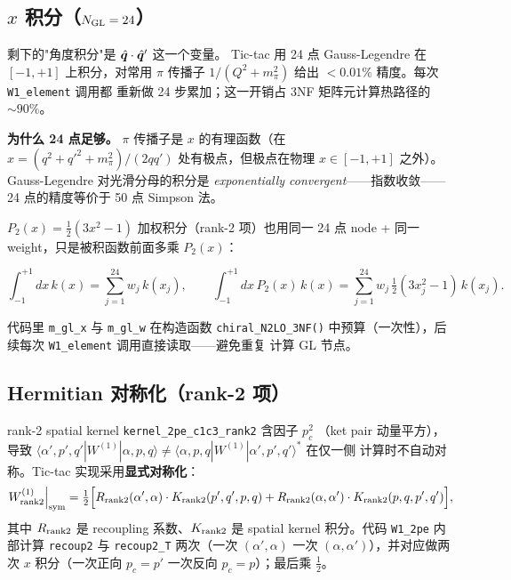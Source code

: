 \subsection{\(x\) 积分（\(N_{\rm GL} = 24\)）}
\label{subsec:ch15-x-integration}

剩下的"角度积分"是 \(\hat{\bm{q}} \cdot \hat{\bm{q}}'\) 这一个变量。
Tic-tac 用 24 点 Gauss-Legendre 在 \([-1, +1]\) 上积分，对常用 \(\pi\) 传播子
\(1/(Q^2 + m_\pi^2)\) 给出 \(<0.01\%\) 精度。每次 \texttt{W1\_element} 调用都
重新做 24 步累加；这一开销占 3NF 矩阵元计算热路径的 \(\sim 90\%\)。

\textbf{为什么 24 点足够。} \(\pi\) 传播子是 \(x\) 的有理函数（在
\(x = (q^2 + q'^2 + m_\pi^2)/(2qq')\) 处有极点，但极点在物理 \(x \in
[-1, +1]\) 之外）。Gauss-Legendre 对光滑分母的积分是
\emph{exponentially convergent}——指数收敛——24 点的精度等价于 50 点
Simpson 法。

\(P_2(x) = \tfrac{1}{2}(3x^2 - 1)\) 加权积分（rank-2 项）也用同一 24 点
node + 同一 weight，只是被积函数前面多乘 \(P_2(x)\)：

\begin{equation}
\label{eq:ch15-x-integration}
\int_{-1}^{+1} dx\, k(x)
= \sum_{j=1}^{24} w_j\, k(x_j),
\qquad
\int_{-1}^{+1} dx\, P_2(x)\, k(x)
= \sum_{j=1}^{24} w_j\, \tfrac{1}{2}(3 x_j^2 - 1)\, k(x_j).
\end{equation}

代码里 \texttt{m\_gl\_x} 与 \texttt{m\_gl\_w} 在构造函数 \texttt{chiral\_N2LO\_3NF()}
中预算（一次性），后续每次 \texttt{W1\_element} 调用直接读取——避免重复
计算 GL 节点。

\subsection{Hermitian 对称化（rank-2 项）}
\label{subsec:ch15-hermitian-sym}

rank-2 spatial kernel \texttt{kernel\_2pe\_c1c3\_rank2} 含因子 \(p_c^2\)
（ket pair 动量平方），导致
\(\langle \alpha', p', q' | W^{(1)} | \alpha, p, q \rangle \neq
 \langle \alpha, p, q | W^{(1)} | \alpha', p', q' \rangle^*\) 在仅一侧
计算时不自动对称。Tic-tac 实现采用\textbf{显式对称化}：
\begin{equation}
\label{eq:ch15-hermitian}
W^{(1)}_{\rm rank2}\Big|_{\rm sym}
= \tfrac{1}{2} \Big[ R_{\rm rank2}(\alpha', \alpha) \cdot K_{\rm rank2}(p',q',p,q)
                   + R_{\rm rank2}(\alpha, \alpha') \cdot K_{\rm rank2}(p,q,p',q') \Big],
\end{equation}
其中 \(R_{\rm rank2}\) 是 recoupling 系数、\(K_{\rm rank2}\) 是 spatial kernel
积分。代码 \texttt{W1\_2pe} 内部计算 \texttt{recoup2} 与 \texttt{recoup2\_T}
两次（一次 \((\alpha', \alpha)\) 一次 \((\alpha, \alpha')\)），并对应做两次
\(x\) 积分（一次正向 \(p_c = p'\) 一次反向 \(p_c = p\)）；最后乘 \(\tfrac{1}{2}\)。

